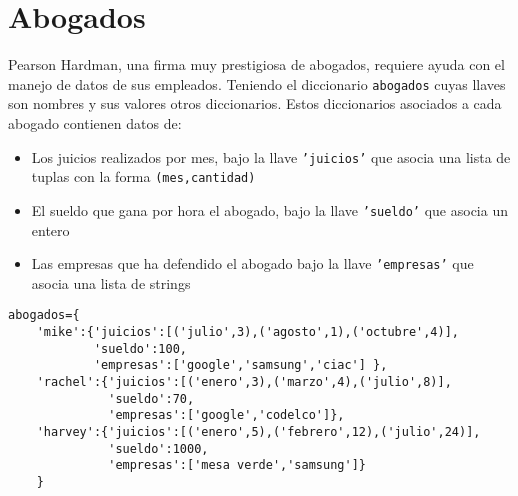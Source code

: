 \section{Abogados}

Pearson Hardman, una firma muy prestigiosa de abogados, requiere ayuda con el manejo de datos de sus empleados. Teniendo el diccionario \texttt{abogados} cuyas llaves son nombres y sus valores otros diccionarios. Estos diccionarios asociados a cada abogado contienen datos de:
\begin{itemize}
    \item Los juicios realizados por mes, bajo la llave \texttt{'juicios'} que asocia una lista de tuplas con la forma \texttt{(mes,cantidad)}
    \item El sueldo que gana por hora el abogado, bajo la llave \texttt{'sueldo'} que asocia un entero
    \item Las empresas que ha defendido el abogado bajo la llave \texttt{'empresas'} que asocia una lista de strings
\end{itemize}

\begin{lstlisting}[style=consola]
abogados={
    'mike':{'juicios':[('julio',3),('agosto',1),('octubre',4)],
            'sueldo':100,
            'empresas':['google','samsung','ciac'] },
    'rachel':{'juicios':[('enero',3),('marzo',4),('julio',8)],
              'sueldo':70,
              'empresas':['google','codelco']},
    'harvey':{'juicios':[('enero',5),('febrero',12),('julio',24)],
              'sueldo':1000,
              'empresas':['mesa verde','samsung']}
    }
\end{lstlisting}

